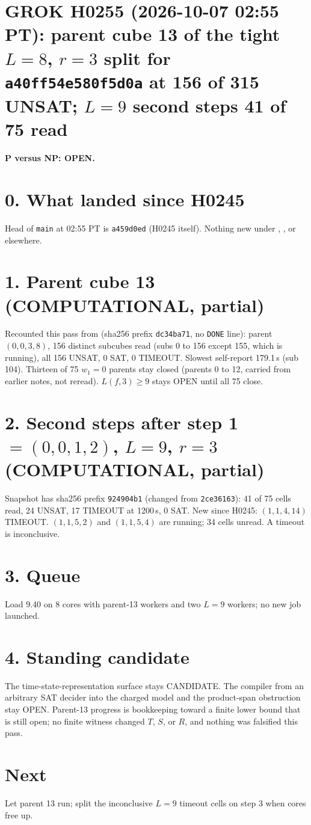 \documentclass[11pt]{article}
\begin{document}
\sloppy
\section*{GROK H0255 (2026-10-07 02:55 PT): parent cube 13 of the tight $L=8$, $r=3$ split for \texttt{a40ff54e580f5d0a} at 156 of 315 UNSAT; $L=9$ second steps 41 of 75 read}
\textbf{P versus NP: OPEN.}

\section*{0. What landed since H0245}
Head of \texttt{main} at 02:55 PT is \texttt{a459d0ed} (H0245 itself). Nothing new under , , or elsewhere.

\section*{1. Parent cube 13 (COMPUTATIONAL, partial)}
Recounted this pass from  (sha256 prefix \texttt{dc34ba71}, no \texttt{DONE} line): parent $(0,0,3,8)$, 156 distinct subcubes read (subs 0 to 156 except 155, which is running), all 156 UNSAT, 0 SAT, 0 TIMEOUT. Slowest self-report 179.1\,s (sub 104). Thirteen of 75 $w_1=0$ parents stay closed (parents 0 to 12, carried from earlier notes, not reread). $L(f,3)\ge 9$ stays OPEN until all 75 close.

\section*{2. Second steps after step 1 $=(0,0,1,2)$, $L=9$, $r=3$ (COMPUTATIONAL, partial)}
Snapshot  has sha256 prefix \texttt{924904b1} (changed from \texttt{2ce36163}): 41 of 75 cells read, 24 UNSAT, 17 TIMEOUT at 1200\,s, 0 SAT. New since H0245: $(1,1,4,14)$ TIMEOUT. $(1,1,5,2)$ and $(1,1,5,4)$ are running; 34 cells unread. A timeout is inconclusive.

\section*{3. Queue}
Load 9.40 on 8 cores with parent-13 workers and two $L=9$ workers; no new job launched.

\section*{4. Standing candidate}
The time-state-representation surface stays CANDIDATE. The compiler from an arbitrary SAT decider into the charged model and the product-span obstruction stay OPEN. Parent-13 progress is bookkeeping toward a finite lower bound that is still open; no finite witness changed $T$, $S$, or $R$, and nothing was falsified this pass.

\section*{Next}
Let parent 13 run; split the inconclusive $L=9$ timeout cells on step 3 when cores free up.
\end{document}
